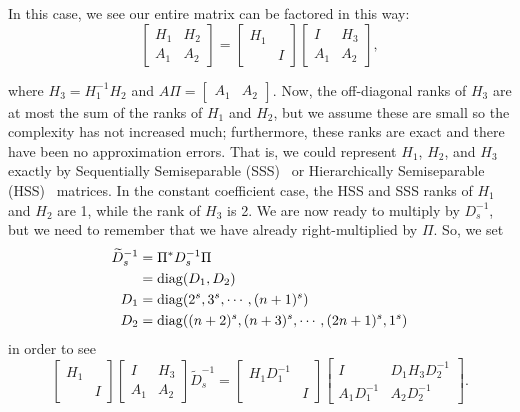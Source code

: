 In this case, we see our entire
matrix can be factored in this way:
%
\begin{equation}
    \begin{bmatrix} H_{1} & H_{2} \\ A_{1} & A_{2} \end{bmatrix}
        = \begin{bmatrix}H_{1} & \\ & I \end{bmatrix}
            \begin{bmatrix} I  & H_{3} \\ A_{1} & A_{2} \end{bmatrix},
\end{equation}

\noindent
where $H_{3} = H_{1}^{-1}H_{2}$ and
$A\Pi = \begin{bmatrix} A_{1} & A_{2} \end{bmatrix}$.
Now, the off-diagonal ranks of $H_{3}$
are at most the sum of the ranks of $H_{1}$ and $H_{2}$, but we assume these
are small so the complexity has not increased much; furthermore,
these ranks are exact and there have been no approximation errors.
That is, we could represent $H_{1}$, $H_{2}$, and $H_{3}$ exactly
by Sequentially Semiseparable (SSS)~\cite{chandrasekaran2005some}
or Hierarchically Semiseparable (HSS)~\cite{Chandrasekaran2005HSS} matrices.
In the constant coefficient case, the HSS and SSS ranks of $H_{1}$ and
$H_{2}$ are 1, while the rank of $H_{3}$ is 2.
We are now ready to multiply by $D_{s}^{-1}$, but we need to remember
that we have already right-multiplied by $\Pi$.
So, we set
%
\begin{align}
    \widetilde{D}_{s}^{-1} &= \Pi^{*}D_{s}^{-1}\Pi \nonumber\\
        &= \operatorname{diag}(D_{1},D_{2}) \nonumber\\
    D_{1} &= \operatorname{diag}(2^{s},3^{s},\cdots,(n+1)^{s}) \nonumber\\
    D_{2} &= \operatorname{diag}((n+2)^{s},(n+3)^{s},\cdots,(2n+1)^{s},1^{s})
\end{align}
%
in order to see
%
\begin{equation}
        \begin{bmatrix}H_{1} & \\ & I \end{bmatrix}
            \begin{bmatrix} I  & H_{3} \\ A_{1} & A_{2} \end{bmatrix}
        \widetilde{D}_{s}^{-1}
        = \begin{bmatrix}H_{1}D_{1}^{-1} & \\ & I \end{bmatrix}
            \begin{bmatrix} I  & D_{1}H_{3}D_{2}^{-1} \\
                A_{1}D_{1}^{-1} & A_{2}D_{2}^{-1} \end{bmatrix}.
\end{equation}
